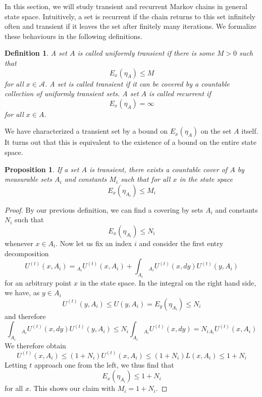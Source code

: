 \documentclass[a4paper, draft]{article}
\theoremstyle{own}
\newtheorem{prop}[thm]{Proposition}
\newtheorem{defn}{Definition}[section]
\theoremstyle{remark}
\begin{document}
In this section, we will study transient and recurrent Markov chains in general state space. Intuitively, a set is recurrent if the chain returns to this set infinitely often and transient if it leaves the set after finitely many iterations. We formalize these behaviours in the following definitions.

\begin{defn}
	A set $A$ is called {\em uniformly transient} if there is some $M > 0$ such that 
	$$
	E_x(\eta_A) \leq M
	$$
	for all $x \in \mathcal A$. A set is called {\em transient} if it can be covered by a countable collection of uniformly transient sets. A set $A$ is called {\em recurrent} if 
	$$
	E_x(\eta_A) = \infty
	$$
	for all $x \in A$. 
\end{defn}

We have characterized a transient set by a bound on $E_x(\eta_A)$ on the set $A$ itself. It turns out that this is equivalent to the existence of a bound on the entire state space. 

\begin{prop}\label{prop:transientimpliesboundedexpectation}
	If a set $A$ is transient, there exists a countable cover of $A$ by measurable sets $A_i$ and constants $M_i$ such that for all $x$ in the state space
	$$
	E_x(\eta_{A_i}) \leq M_i
	$$
\end{prop}

\begin{proof}
	By our previous definition, we can find a covering by sets $A_i$ and constants $N_i$ such that
	$$
	E_x(\eta_{A_i}) \leq N_i
	$$
	whenever $x \in A_i$. Now let us fix an index $i$ and consider the first entry decomposition
	$$
	U^{(t)}(x,A_i) = {_{A_i}}U^{(t)}(x,A_i) + 
	\int_{A_i} {_{A_i}}U^{(t)}(x,dy) U^{(t)}(y, A_i) 
	$$
	for an arbitrary point $x$ in the state space. In the integral on the right hand side, we have, as $y \in A_i$
	$$
	U^{(t)}(y, A_i) \leq U(y, A_i) = E_y(\eta_{A_i}) \leq N_i
	$$
	and therefore
	$$
	\int_{A_i} {_{A_i}}U^{(t)}(x,dy) U^{(t)}(y, A_i) 
	\leq N_i \int_{A_i} {_{A_i}}U^{(t)}(x,dy) = N_i {_{A_i}}U^{(t)}(x,A_i)
	$$
	We therefore obtain 
	$$
	U^{(t)}(x,A_i) \leq (1+N_i) U^{(t)}(x,A_i) \leq (1+N_i) L(x,A_i) \leq 1 + N_i
	$$
	Letting $t$ approach one from the left, we thus find that
	$$
	E_x(\eta_{A_i}) \leq 1 + N_i
	$$
	for all $x$. This shows our claim with $M_i = 1 + N_i$. 
\end{proof}
\end{document}
